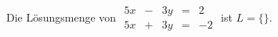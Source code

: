 
Die Lösungsmenge von \quad  
$\begin{array}{|lclcr|}
5x &-& 3y &=& 2\\
5x &+& 3y &=& -2
\end{array}$ \quad ist $L=\{\}$.

